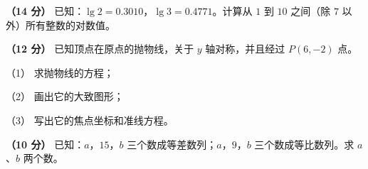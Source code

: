 \begin{question}
\textbf{（14 分）} 已知：$\lg2=0.3010$，$\lg3=0.4771$。计算从 $1$ 到 $10$ 之间（除 $7$ 以外）所有整数的对数值。

\end{question}
\begin{question}
\textbf{（12 分）} 已知顶点在原点的抛物线，关于 $y$ 轴对称，并且经过 $P(6,-2)$ 点。

（1） 求抛物线的方程；

（2） 画出它的大致图形；

（3） 写出它的焦点坐标和准线方程。

\end{question}
\begin{question}
\textbf{（10 分）} 已知：$a$，$15$，$b$ 三个数成等差数列；$a$，$9$，$b$ 三个数成等比数列。求 $a$、$b$ 两个数。

\end{question}